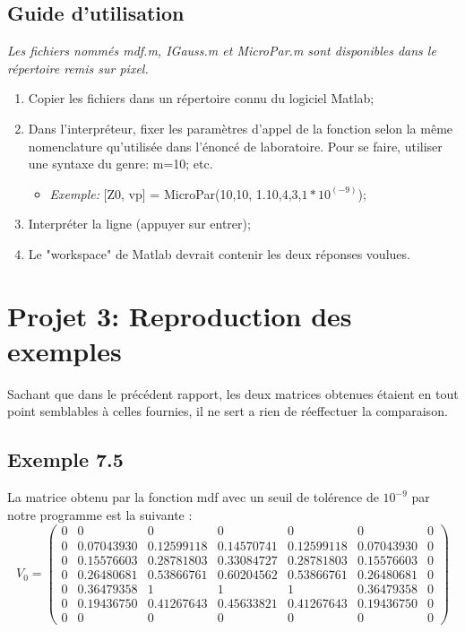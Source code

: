 \subsection{Guide d'utilisation}

\textit{Les fichiers nommés mdf.m, IGauss.m et MicroPar.m sont disponibles dans le répertoire remis sur pixel.}
\begin{enumerate}
\item Copier les fichiers dans un répertoire connu du logiciel Matlab;
\item Dans l'interpréteur, fixer les paramètres d'appel de la fonction selon la même nomenclature qu'utilisée dans l'énoncé de laboratoire. Pour se faire, utiliser une syntaxe du genre: m=10; etc. 
\begin{itemize}
\item \textit{Exemple:} [Z0, vp] = MicroPar(10,10, 1.10,4,3,$1*10^{(-9)}$);
\end{itemize}
\item Interpréter la ligne (appuyer sur entrer);
\item Le "workspace" de Matlab devrait contenir les deux réponses voulues.
\end{enumerate}

\section{Projet 3: Reproduction des exemples}
Sachant que dans le précédent rapport, les deux matrices obtenues étaient en tout point semblables à celles fournies, il ne sert a rien de réeffectuer la comparaison.
\subsection{Exemple 7.5}

La matrice obtenu par la fonction mdf avec un seuil de tolérence de $10^{-9}$ par notre programme est la suivante :
\[V_0  = \left(\begin{array}{ccccccc}
0 & 0 			& 0 			& 0 			& 0 			& 0 			& 0 \\
0 & 0.07043930 	& 0.12599118 	& 0.14570741	& 0.12599118	& 0.07043930 	& 0 \\
0 & 0.15576603 	& 0.28781803 	& 0.33084727 	& 0.28781803 	& 0.15576603 	& 0 \\
0 & 0.26480681 	& 0.53866761 	& 0.60204562  	& 0.53866761 	& 0.26480681 	& 0 \\
0 & 0.36479358 	& 1				& 1				& 1			 	& 0.36479358 	& 0 \\
0 & 0.19436750 	& 0.41267643 	& 0.45633821	& 0.41267643 	& 0.19436750 	& 0 \\
0 & 0 			& 0 			& 0 			& 0 			& 0 			& 0 
\end{array} \right)\]

